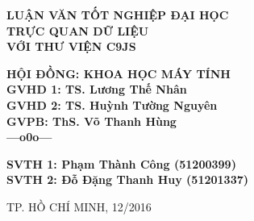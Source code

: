 \documentclass[12pt,a4paper]{article}
\begin{document}
\begin{titlepage}
\textbf{\large LUẬN VĂN TỐT NGHIỆP ĐẠI HỌC}\\[0.8cm]


{\Huge \bfseries TRỰC QUAN DỮ LIỆU \\VỚI THƯ VIỆN C9JS} \\[1.5cm]


\begin{flushleft}
\tab[5cm]\textbf{HỘI ĐỒNG: KHOA HỌC MÁY TÍNH}\\
\tab[5cm]\textbf{GVHD 1: TS. Lương Thế Nhân}\\
\tab[5cm]\textbf{GVHD 2: TS. Huỳnh Tường Nguyên}\\
\tab[5cm]\textbf{GVPB: ThS. Võ Thanh Hùng}\\
\tab[8cm] \textbf{---o0o---}
\end{flushleft}

\begin{flushleft}
\tab[5cm]\textbf{SVTH 1: Phạm Thành Công (51200399)}\\
\tab[5cm]\textbf{SVTH 2: Đỗ Đặng Thanh Huy (51201337)}
\end{flushleft}

\vfill
{\normalsize TP. HỒ CHÍ MINH, 12/2016}

\end{titlepage}
\end{document}
